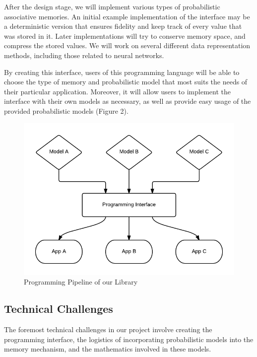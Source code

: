 \documentclass{sig-alternate}
\begin{document}
After the design stage, we will implement various types of probabilistic associative memories.
An initial example implementation of the interface may be a deterministic version that
ensures fidelity and keep track of every value that
was stored in it. Later implementations will try to conserve memory space,
and compress the stored values. We will work on several different data representation methods,
including those related to neural networks. 

By creating this interface, users of this programming language will be able to
choose the type of memory and probabilistic model that most suits the needs of their particular
application. Moreover, it will allow users to implement the interface with their own models as necessary, 
as well as provide easy usage of the provided probabilistic models (Figure 2).

\begin{figure}[H]
	\begin{center}
		\includegraphics[width=1\linewidth]{block2}
	\end{center}
	\vspace{-12pt}
	\caption{Programming Pipeline of our Library}
	\label{fig:block2}
\end{figure}

\subsection{Technical Challenges}
\label{subsec:tech_challenges}
The foremost technical challenges in our project involve creating the programming interface,
the logistics of incorporating probabilistic models into the memory mechanism, and
the mathematics involved in these models.
\end{document}
